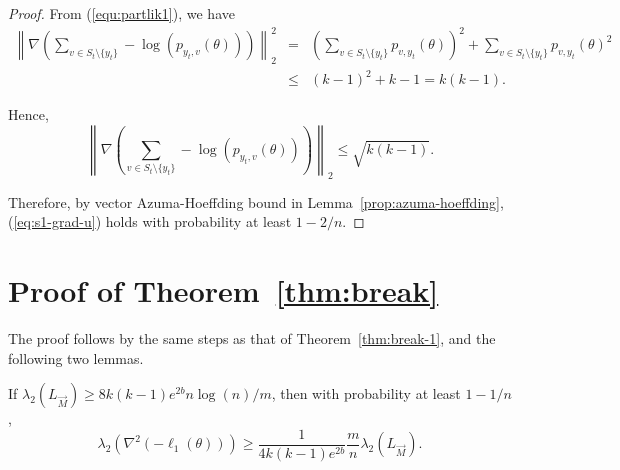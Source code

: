 \begin{proof}
From (\ref{equ:partlik1}), we have
\begin{eqnarray}
\left\|\nabla\left(\sum_{v\in S_t\setminus \{y_t\}}-\log(p_{y_t,v}(\theta))\right)\right\|_2^2
& = & \left(\sum_{v\in S_t\setminus \{y_t\}} p_{v,y_t}(\theta)\right)^2 + \sum_{v\in S_t\setminus \{y_t\}} p_{v,y_t}(\theta)^2\nonumber\\ 
& \le &  (k-1)^2 + k-1 = k(k-1).\nonumber
\end{eqnarray}

Hence,
\begin{equation}
\left\|\nabla\left(\sum_{v\in S_t\setminus \{y_t\}}-\log(p_{y_t,v}(\theta))\right)\right\|_2 \leq \sqrt{k(k-1)}.
\label{equ:lk1sigma}
\end{equation}

Therefore, by vector Azuma-Hoeffding bound in Lemma~\ref{prop:azuma-hoeffding}, (\ref{eq:s1-grad-u}) holds with probability at least $1-2/n$.
\end{proof}

\section{Proof of Theorem~\ref{thm:break}} \label{sec:proof-break}

The proof follows by the same steps as that of Theorem~\ref{thm:break-1}, and the following two lemmas.


\begin{lemma} If $\lambda_2\left( L_{\vec{M}} \right) \ge 8k(k-1)e^{2b}n\log(n)/m$, then with probability at least $1-1/n$,
\begin{equation}
\lambda_2(\nabla^2(-\ell_1(\theta))) \ge \frac{1}{4k(k-1) e^{2b}}\frac{m}{n}\lambda_2 (L_{\vec{M}}).
\label{eq:2-chernoff}
\end{equation}
\label{lem:breakk1lambda}
\end{lemma}

